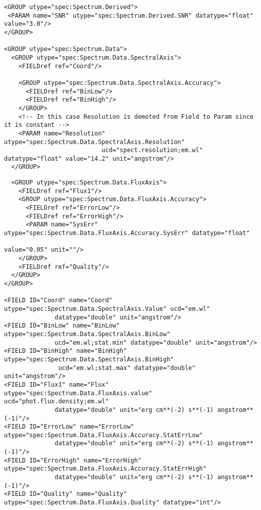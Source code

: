 {\begin{flushleft}
\begin{fmpage}
\begin{verbatim}
<GROUP utype="spec:Spectrum.Derived">
 <PARAM name="SNR" utype="spec:Spectrum.Derived.SNR" datatype="float" value="3.0"/>
</GROUP>

<GROUP utype="spec:Spectrum.Data">
  <GROUP utype="spec:Spectrum.Data.SpectralAxis">
    <FIELDref ref="Coord"/>

    <GROUP utype="spec:Spectrum.Data.SpectralAxis.Accuracy">
      <FIELDref ref="BinLow"/>
      <FIELDref ref="BinHigh"/>
    </GROUP>
    <!-- In this case Resolution is demoted from Field to Param since it is constant -->
    <PARAM name="Resolution" utype="spec:Spectrum.Data.SpectralAxis.Resolution" 
                           ucd="spect.resolution;em.wl" datatype="float" value="14.2" unit="angstrom"/>
  </GROUP>

\end{verbatim}
\end{fmpage}

\begin{fmpage}
\begin{verbatim}
  <GROUP utype="spec:Spectrum.Data.FluxAxis">
    <FIELDref ref="Flux1"/>
    <GROUP utype="spec:Spectrum.Data.FluxAxis.Accuracy">
      <FIELDref ref="ErrorLow"/>
      <FIELDref ref="ErrorHigh"/>
      <PARAM name="SysErr" utype="spec:Spectrum.Data.FluxAxis.Accuracy.SysErr" datatype="float"
                                                                                 value="0.05" unit=""/>
    </GROUP>
    <FIELDref ref="Quality"/>
  </GROUP>
</GROUP>

<FIELD ID="Coord" name="Coord" utype="spec:Spectrum.Data.SpectralAxis.Value" ucd="em.wl"
              datatype="double" unit="angstrom"/>
<FIELD ID="BinLow" name="BinLow" utype="spec:Spectrum.Data.SpectralAxis.BinLow" 
              ucd="em.wl;stat.min" datatype="double" unit="angstrom"/>
<FIELD ID="BinHigh" name="BinHigh" utype="spec:Spectrum.Data.SpectralAxis.BinHigh"
               ucd="em.wl;stat.max" datatype="double" unit="angstrom"/>
<FIELD ID="Flux1" name="Flux" utype="spec:Spectrum.Data.FluxAxis.value" ucd="phot.flux.density;em.wl"
              datatype="double" unit="erg cm**(-2) s**(-1) angstrom**(-1)"/>
<FIELD ID="ErrorLow" name="ErrorLow" utype="spec:Spectrum.Data.FluxAxis.Accuracy.StatErrLow" 
              datatype="double" unit="erg cm**(-2) s**(-1) angstrom**(-1)"/>
<FIELD ID="ErrorHigh" name="ErrorHigh" utype="spec:Spectrum.Data.FluxAxis.Accuracy.StatErrHigh" 
              datatype="double" unit="erg cm**(-2) s**(-1) angstrom**(-1)"/>
<FIELD ID="Quality" name="Quality" utype="spec:Spectrum.Data.FluxAxis.Quality" datatype="int"/>


\end{verbatim}
\end{fmpage}
\end{flushleft}}
